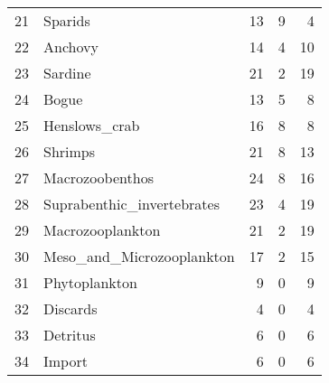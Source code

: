 \begin{tabular}{rlrrr}
   21 &                          Sparids &      13 &          9 &           4 \\
   22 &                          Anchovy &      14 &          4 &          10 \\
   23 &                          Sardine &      21 &          2 &          19 \\
   24 &                            Bogue &      13 &          5 &           8 \\
   25 &                    Henslows\_crab &      16 &          8 &           8 \\
   26 &                          Shrimps &      21 &          8 &          13 \\
   27 &                  Macrozoobenthos &      24 &          8 &          16 \\
   28 &       Suprabenthic\_invertebrates &      23 &          4 &          19 \\
   29 &                 Macrozooplankton &      21 &          2 &          19 \\
   30 &        Meso\_and\_Microzooplankton &      17 &          2 &          15 \\
   31 &                    Phytoplankton &       9 &          0 &           9 \\
   32 &                         Discards &       4 &          0 &           4 \\
   33 &                         Detritus &       6 &          0 &           6 \\
   34 &                           Import &       6 &          0 &           6 \\
\bottomrule
\end{tabular}
